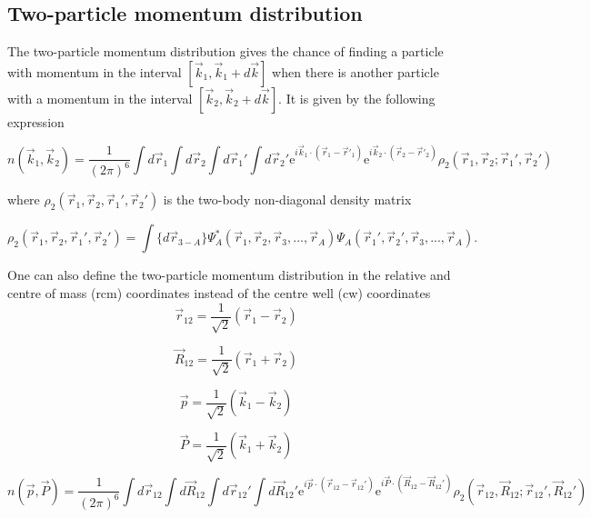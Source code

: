 \documentclass[12pt]{article}
\begin{document}
\subsection{Two-particle momentum distribution}

The two-particle momentum distribution gives the chance of finding a particle with momentum in the interval $[\vec{k}_1,\vec{k}_1+d\vec{k}]$ when there is another particle with a momentum in the interval $[\vec{k}_2,\vec{k}_2+d\vec{k}]$. It is given by the following expression

\begin{equation}
n(\vec{k}_1,\vec{k}_2)=\frac{1}{(2\pi)^6}\int d\vec{r}_1 \int d\vec{r}_2 \int  
    						d\vec{r}_1' \int d\vec{r}_2' 
    						\mathrm{e}^{i\vec{k}_1\cdot (\vec{r}_1-\vec{r}'_1)} 
    						\mathrm{e}^{i\vec{k}_2\cdot(\vec{r}_2-\vec{r}'_2)}
    						\rho_2(\vec{r}_1,\vec{r}_2; \vec{r}_1',\vec{r}_2')
\end{equation}

where $\rho_2(\vec{r}_1,\vec{r}_2, \vec{r}_1',\vec{r}_2')$ is the two-body non-diagonal density matrix


\begin{equation}
\rho_2(\vec{r}_1,\vec{r}_2, \vec{r}_1',\vec{r}_2') = \int \{d\vec{r}_{3-A}\} \Psi^*_A(\vec{r}_1,\vec{r}_2,\vec{r}_3, ... ,\vec{r}_A)\Psi_A(\vec{r}_1',\vec{r}_2',\vec{r}_3, ... ,\vec{r}_A).
\end{equation}

One can also define the two-particle momentum distribution in the relative and centre of mass (rcm) coordinates instead of the centre well (cw) coordinates
\begin{equation}
\vec{r}_{12}= \frac{1}{\sqrt{2}} \left(\vec{r}_1 - \vec{r}_2\right)  
\end{equation}

\begin{equation}
\vec{R}_{12}= \frac{1}{\sqrt{2}} \left(\vec{r}_1 + \vec{r}_2\right)
\end{equation}

\begin{equation}
\vec{p}= \frac{1}{\sqrt{2}} \left(\vec{k}_1 - \vec{k}_2\right)
\end{equation}

\begin{equation}
\vec{P}= \frac{1}{\sqrt{2}} \left(\vec{k}_1 + \vec{k}_2\right)
\end{equation}


\begin{equation}
n(\vec{p},\vec{P})=\frac{1}{(2\pi)^6}
						\int d\vec{r}_{12} \int d\vec{R}_{12} \int d\vec{r}_{12}' \int d\vec{R}_{12}' 
    						\mathrm{e}^{i\vec{p}\cdot (\vec{r}_{12}-\vec{r}_{12}')} 
    						\mathrm{e}^{i\vec{P}\cdot(\vec{R}_{12}-\vec{R}_{12}')} 
    						\rho_2(\vec{r}_{12},\vec{R}_{12}; \vec{r}_{12}',\vec{R}_{12}')
\end{equation}
\end{document}
